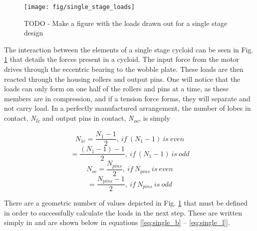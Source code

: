 \begin{figure}[t]
   \centering
   \texttt{[image: fig/single\_stage\_loads]}
   \caption{TODO - Make a figure with the loads drawn out for a single stage design}
   \label{fig:single_loads}
\end{figure}

The interaction between the elements of a single stage cycloid can be seen in Fig. \ref{fig:single_loads} that details the forces present in a cycloid. The input force from the motor drives through the eccentric bearing to the wobble plate. These loads are then reacted through the housing rollers and output pins. One will notice that the loads can only form on one half of the rollers and pins at a time, as these members are in compression, and if a tension force forms, they will separate and not carry load. In a perfectly manufactured arrangement, the number of lobes in contact, \textit{N\textsubscript{lc}} and output pins in contact, \textit{N\textsubscript{oc}}, is simply 

\begin{equation}
N_{1c} = \frac{N_{1} - 1}{2},\ if\ (N_1 -1)\ is\ even 
\end{equation}
\begin{equation}
= \frac{(N_{1}-1) - 1}{2},\ if\ (N_{1} - 1)\ is\ odd 
\end{equation}
\begin{equation}
N_{oc} = \frac{N_{pins}}{2},\ if\ N_{pins}\ is\ even 
\end{equation}
\begin{equation}
= \frac{N_{pins} - 1}{2},\ if\ N_{pins}\ is\ odd 
\end{equation}

There are a geometric number of values depicted in Fig. \ref{fig:single_loads} that must be defined in order to successfully calculate the loads in the next step. These are written simply in \cite{hwang_geometry} and are shown below in equations [\ref{eq:single_b} -- \ref{eq:single_l}]. 

